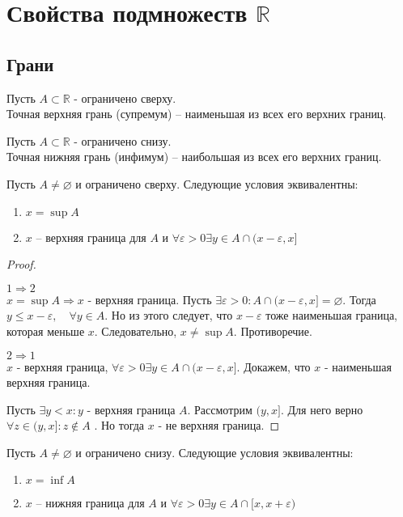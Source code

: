 \documentclass[11pt]{book}
\newcommand{\R}{\mathbb{R}}
\renewcommand{\le}{\leqslant}
\theoremstyle{definition}
\theoremstyle{plain}
\theoremstyle{plain}
\theoremstyle{definition}
\theoremstyle{remark}
\begin{document}
\section{Свойства подмножеств $\R$}
\subsection{Грани}\label{ques_7}
\begin{defn}[supremum]
    Пусть $A \subset \R$ - ограничено сверху. \\
    Точная верхняя грань (супремум) -- наименьшая из всех его верхних границ.
\end{defn}
\begin{defn}[infimum]
    Пусть $A \subset \R$ - ограничено снизу. \\
    Точная нижняя грань (инфимум) -- наибольшая из всех его верхних границ.
\end{defn}
\begin{thm}
    Пусть $A \ne \varnothing$ и ограничено сверху. Следующие условия эквивалентны:
    \begin{enumerate}
        \item $x = \sup A$
	\item $x$ -- верхняя граница для $A$ и $\forall \varepsilon >0 \exists y \in A \cap (x - \varepsilon , x]$
    \end{enumerate}
\end{thm}
\begin{proof}$ $
    \begin{description}
	\item $1 \Rightarrow 2$\\
	    $x = \sup A \Rightarrow x $ - верхняя граница. Пусть $\exists \varepsilon >0: A \cap (x-\varepsilon , x] = \varnothing$. Тогда $y \le x - \varepsilon , \quad \forall y \in A$.
	    Но из этого следует, что $x-\varepsilon $ тоже наименьшая граница, которая меньше $x$. Следовательно, $x \ne \sup A$. Противоречие.
	\item $2 \Rightarrow 1$ \\
	        $x$ - верхняя граница, $\forall \varepsilon >0 \exists y \in  A \cap (x-\varepsilon , x]$. Докажем, что $x$ - наименьшая верхняя граница.
    \end{description}
    Пусть $\exists y < x: y$  - верхняя граница $A$. Рассмотрим $(y, x]$. Для него верно $\forall z \in (y, x]: z \notin A$ . Но тогда $x$ - не верхняя граница.
\end{proof}
\begin{thm}
    Пусть $A \ne \varnothing$ и ограничено снизу. Следующие условия эквивалентны:
    \begin{enumerate}
        \item $x = \inf  A$
	\item $x$ -- нижняя граница для $A$ и $\forall \varepsilon >0 \exists y \in A \cap [x, x+ \varepsilon)$
    \end{enumerate}
\end{thm}
\end{document}
